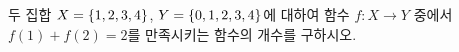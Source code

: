 두 집합 $X=\{1{,}\mkern3mu\mathopen{}2{,}\mkern3mu\mathopen{}3{,}\mkern3mu\mathopen{}4\}$, $Y=\{0{,}\mkern3mu\mathopen{}1{,}\mkern3mu\mathopen{}2{,}\mkern3mu\mathopen{}3{,}\mkern3mu\mathopen{}4\}$에 대하여 함수 $f:X\longrightarrow Y$ 중에서 $f(1)+f(2)=2$를 만족시키는 함수의 개수를 구하시오.
